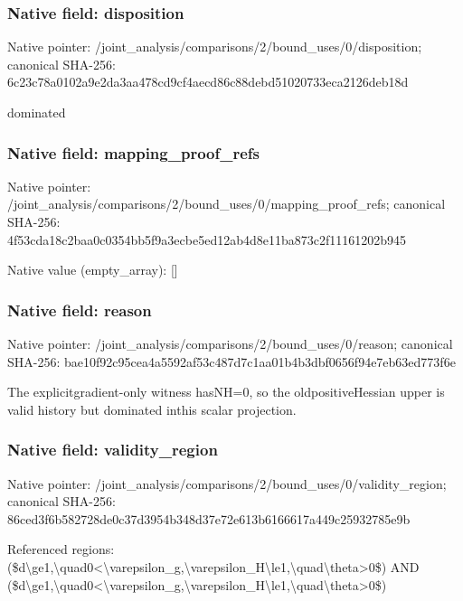 \documentclass[10pt,a4paper]{article}
\begin{document}
\subsubsection{Native field: disposition}
Native pointer: /joint\_\allowbreak{}analysis/comparisons/2/bound\_\allowbreak{}uses/0/disposition; canonical SHA-256: 6c23c78a0102a9e2da3aa478cd9cf4aecd86c88debd51020733eca2126deb18d

\begingroup\raggedright\sloppy dominated\par\endgroup

\subsubsection{Native field: mapping\_\allowbreak{}proof\_\allowbreak{}refs}
Native pointer: /joint\_\allowbreak{}analysis/comparisons/2/bound\_\allowbreak{}uses/0/mapping\_\allowbreak{}proof\_\allowbreak{}refs; canonical SHA-256: 4f53cda18c2baa0c0354bb5f9a3ecbe5ed12ab4d8e11ba873c2f11161202b945

Native value (empty\_\allowbreak{}array): []

\subsubsection{Native field: reason}
Native pointer: /joint\_\allowbreak{}analysis/comparisons/2/bound\_\allowbreak{}uses/0/reason; canonical SHA-256: bae10f92c95cea4a5592af53c487d7c1aa01b4b3dbf0656f94e7eb63ed773f6e

\begingroup\raggedright\sloppy The explicitgradient-only witness hasNH=\allowbreak{}0,\allowbreak{} so the oldpositiveHessian upper is valid history but dominated inthis scalar projection.\par\endgroup

\subsubsection{Native field: validity\_\allowbreak{}region}
Native pointer: /joint\_\allowbreak{}analysis/comparisons/2/bound\_\allowbreak{}uses/0/validity\_\allowbreak{}region; canonical SHA-256: 86ced3f6b582728de0c37d3954b348d37e72e613b6166617a449c25932785e9b

\begingroup\raggedright\sloppy Referenced regions:\allowbreak{} (\$d\textbackslash{}ge1,\allowbreak{}\textbackslash{}quad0<\textbackslash{}varepsilon\_\allowbreak{}g,\allowbreak{}\textbackslash{}varepsilon\_\allowbreak{}H\textbackslash{}le1,\allowbreak{}\textbackslash{}quad\textbackslash{}theta>0\$) AND (\$d\textbackslash{}ge1,\allowbreak{}\textbackslash{}quad0<\textbackslash{}varepsilon\_\allowbreak{}g,\allowbreak{}\textbackslash{}varepsilon\_\allowbreak{}H\textbackslash{}le1,\allowbreak{}\textbackslash{}quad\textbackslash{}theta>0\$)\par\endgroup
\end{document}
